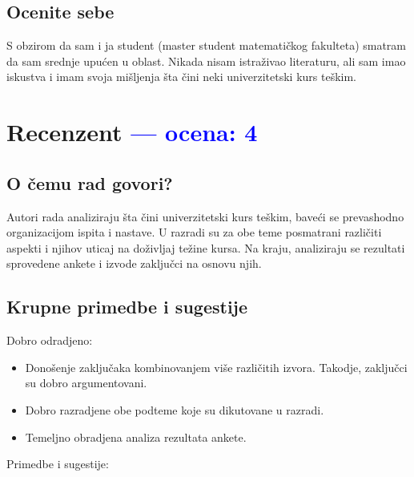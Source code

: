 \documentclass[a4paper]{report}
\newcommand{\odgovor}[1]{\textcolor{blue}{#1}}
\begin{document}
\section{Ocenite sebe}
S obzirom da sam i ja student (master student matematičkog fakulteta) smatram da sam srednje upućen u oblast. Nikada nisam istraživao literaturu, ali sam imao iskustva i imam svoja mišljenja šta čini neki univerzitetski kurs teškim.

\chapter{Recenzent \odgovor{--- ocena: 4} }


\section{O čemu rad govori?}

Autori rada analiziraju šta čini univerzitetski kurs teškim, baveći se prevashodno organizacijom ispita i nastave. U razradi su za obe teme posmatrani različiti aspekti i njihov uticaj na doživljaj težine kursa. Na kraju, analiziraju se rezultati sprovedene ankete i izvode zaključci na osnovu njih.

\section{Krupne primedbe i sugestije}

Dobro odradjeno:

\begin{itemize}
    \item Donošenje zaključaka kombinovanjem više različitih izvora. Takodje, zaključci su dobro argumentovani.

    \item Dobro razradjene obe podteme koje su dikutovane u razradi.

    \item Temeljno obradjena analiza rezultata ankete.

\end{itemize}


Primedbe i sugestije:
\end{document}
